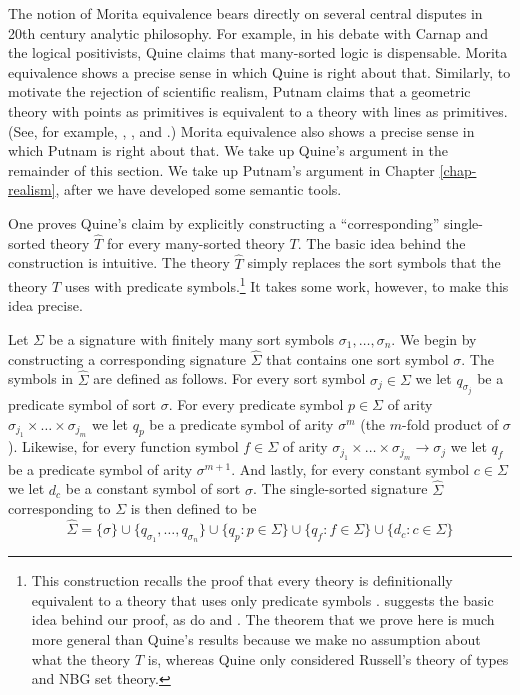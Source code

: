The notion of Morita equivalence bears directly on several central
disputes in 20th century analytic philosophy.  For example, in his
debate with Carnap and the logical positivists, Quine claims that
many-sorted logic is dispensable.  Morita equivalence shows a precise
sense in which Quine is right about that.  Similarly, to motivate the
rejection of scientific realism, Putnam claims that a geometric theory
with points as primitives is equivalent to a theory with lines as
primitives.  (See, for example, \cite[489-91]{putnam1977}, \cite[109,
115-20]{putnam1992}, and \cite{putnam2001}.)  Morita equivalence also
shows a precise sense in which Putnam is right about that.  We take up
Quine's argument in the remainder of this section.  We take up
Putnam's argument in Chapter \ref{chap-realism}, after we have
developed some semantic tools.

One proves Quine's claim by explicitly constructing a
``corresponding'' single-sorted theory $\widehat{T}$ for every
many-sorted theory $T$. The basic idea behind the construction is
intuitive. The theory $\widehat{T}$ simply replaces the sort symbols
that the theory $T$ uses with predicate symbols.\footnote{This
  construction recalls the proof that every theory is definitionally
  equivalent to a theory that uses only predicate symbols
  \cite[Prop.~2]{barrett-glymour}. \cite{quine1937, quine1938,
    quine1956, quine1963} suggests the basic idea behind our proof, as
  do \citet[12]{burgess2005} and \citet[221-2]{manzano-book}. The
  theorem that we prove here is much more general than Quine's results
  because we make no assumption about what the theory $T$ is, whereas
  Quine only considered Russell's theory of types and NBG set theory.}
It takes some work, however, to make this idea precise.

Let $\Sigma$ be a signature with finitely many sort symbols
$\sigma_1,\ldots, \sigma_n$. We begin by constructing a corresponding
signature $\widehat{\Sigma}$ that contains one sort symbol
$\sigma$. The symbols in $\widehat{\Sigma}$ are defined as follows.
For every sort symbol $\sigma_j\in\Sigma$ we let $q_{\sigma_j}$ be a
predicate symbol of sort $\sigma$.
For every predicate symbol $p\in\Sigma$ of arity
$\sigma_{j_1}\times\ldots\times\sigma_{j_m}$ we let $q_p$ be a
predicate symbol of arity $\sigma^m$ (the $m$-fold product of
$\sigma$).
Likewise, for every function symbol $f\in\Sigma$ of arity
$\sigma_{j_1}\times\ldots\times\sigma_{j_m}\rightarrow\sigma_j$ we let
$q_f$ be a predicate symbol of arity $\sigma^{m+1}$.
And lastly, for every constant symbol $c\in\Sigma$ we let $d_c$ be a constant symbol of sort $\sigma$.
The single-sorted signature $\widehat{\Sigma}$ corresponding to $\Sigma$ is then defined to be
$$
\widehat{\Sigma}=\{\sigma\}\cup\{q_{\sigma_1},\ldots,
q_{\sigma_n}\}\cup\{q_p: p\in\Sigma\}\cup\{q_f: f\in\Sigma\}\cup\{d_c:
c\in\Sigma\}
$$

